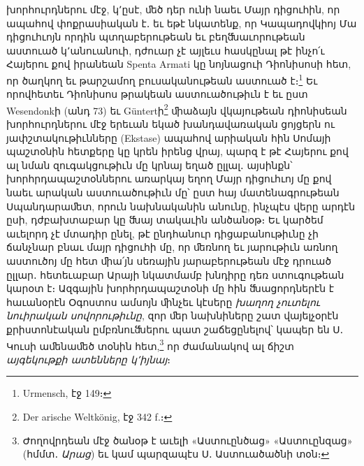 \documentclass{article}
\begin{document}
{խորհուրդներու մէջ, կ՚ըսէ, ﬔծ դեր ունի նաեւ Մայր դիցուհին, որ ապահով փոքրասիական է․ եւ եթէ նկատենք, որ Կապադովկիոյ Մա դիցուհւոյն որդին պտղաբերութեան եւ բեղﬓաւորութեան աստուած կ՚անուանուի, դժուար չէ այլեւս հասկընալ թէ ինչո՛ւ Հայերու քով իրանեան Spenta Armati կը նոյնացուի Դիոնիսոսի հետ, որ ծաղկող եւ թարշամող բուսականութեան աստուած է։\footnote{Urmensch, էջ 149։} Եւ որովհետեւ Դիոնիսոս թրակեան աստուածութիւն է եւ ըստ Wesendonkի (անդ 73) եւ Güntertի\footnote{Der arische Weltkönig, էջ 342 f.։} ﬕաձայն վկայութեան դիոնիսեան խորհուրդներու մէջ երեւան եկած խանդավառական ցոյցերն ու յափշտակութիւնները (Ekstase) ապահով արիական հին Սոմայի պաշտօնին հետքերը կը կրեն իրենց վրայ, պարզ է թէ Հայերու քով ալ նման զուգակցութիւն մը կրնայ եղած ըլլալ․ այսինքն՝ խորհրդապաշտօններու առարկայ եղող Մայր դիցուհւոյ մը քով նաեւ արական աստուածութիւն մը՝ ըստ հայ մատենագրութեան Սպանդարաﬔտ, որուն նախնականին անունը, ինչպէս վերը արդէն ըսի, դժբախտաբար կը ﬓայ տակաւին անծանօթ։ Եւ կարծեմ աւելորդ չէ մտադիր ընել, թէ ընդհանուր դիցաբանութիւնը չի ճանչնար բնաւ մայր դիցուհի մը, որ ﬔռնող եւ յարութիւն առնող աստուծոյ մը հետ ﬕա՛յն սեռային յարաբերութեան մէջ դրուած ըլլար․ հետեւաբար Արայի նկատմամբ խնդիրը դեռ ստուգութեան կարօտ է։ Ազգային խորհրդապաշտօնի մը հին ﬓացորդներէն է հաւանօրէն Օգոստոս ամսոյն ﬕնչեւ կէսերը \emph{խաղող չուտելու նուիրական սովորութիւնը}, զոր ﬔր նախնիները շատ վայելչօրէն քրիստոնէական ըմբռնուﬓերու պատ շաճեցընելով՝ կապեր են Ս․ Կուսի աﬔնաﬔծ տօնին հետ,\footnote{Ժողովրդեան մէջ ծանօթ է աւելի «Աստուընծաց» «Աստուընզաց» (հմմտ․ \emph{Արաց}) եւ կամ պարզապէս Ս․ Աստուածածնի տօն։} որ ժամանակով ալ ճիշտ \emph{այգեկութքի ատենները կ՚իյնայ}։

}
\end{document}
